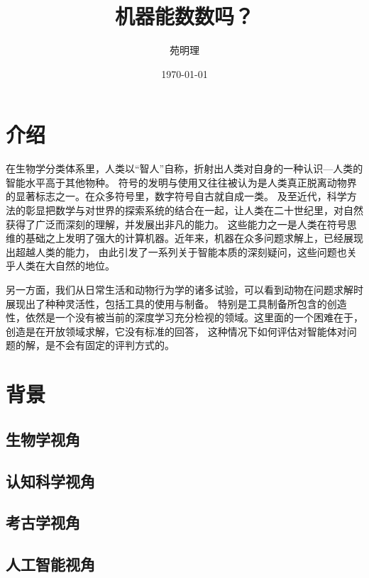 \documentclass[a4paper,12pt]{article}
\title{机器能数数吗？}
\author{苑明理}
\date{\monthyeardate\today}
\begin{document}
\begingroup
\let\newpage\relax
\maketitle
\endgroup

\renewcommand\contentsname{目录}
\setcounter{tocdepth}{2}
\tableofcontents

\newpage

\section{介绍}

在生物学分类体系里，人类以“智人”自称，折射出人类对自身的一种认识—人类的智能水平高于其他物种。
符号的发明与使用又往往被认为是人类真正脱离动物界的显著标志之一。在众多符号里，数字符号自古就自成一类。
及至近代，科学方法的彰显把数学与对世界的探索系统的结合在一起，让人类在二十世纪里，对自然获得了广泛而深刻的理解，并发展出非凡的能力。
这些能力之一是人类在符号思维的基础之上发明了强大的计算机器。近年来，机器在众多问题求解上，已经展现出超越人类的能力，
由此引发了一系列关于智能本质的深刻疑问，这些问题也关乎人类在大自然的地位。

另一方面，我们从日常生活和动物行为学的诸多试验，可以看到动物在问题求解时展现出了种种灵活性，包括工具的使用与制备。
特别是工具制备所包含的创造性，依然是一个没有被当前的深度学习充分检视的领域。这里面的一个困难在于，创造是在开放领域求解，它没有标准的回答，
这种情况下如何评估对智能体对问题的解，是不会有固定的评判方式的。


\section{背景}

\subsection{生物学视角}

\subsection{认知科学视角}

\subsection{考古学视角}

\subsection{人工智能视角}
\end{document}
